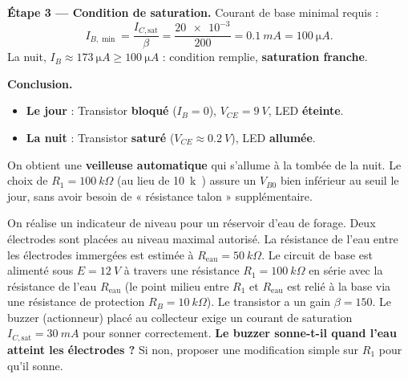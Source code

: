 \documentclass[11pt]{article}
\begin{document}
\begin{exoresolu}
\textbf{Étape 3 — Condition de saturation.}
Courant de base minimal requis :
\[ I_{B,\min} = \frac{I_{C,\text{sat}}}{\beta} = \frac{\num{20e-3}}{200} = \SI{0,1}{mA} = \SI{100}{\micro A}. \]
La nuit, $I_B \approx \SI{173}{\micro A} \geq \SI{100}{\micro A}$ : condition remplie, \textbf{saturation franche}.

\textbf{Conclusion.}
\begin{itemize}
\item \textbf{Le jour} : Transistor \textbf{bloqué} ($I_B=0$), $V_{CE} = \SI{9}{V}$, LED \textbf{éteinte}.
\item \textbf{La nuit} : Transistor \textbf{saturé} ($V_{CE} \approx \SI{0,2}{V}$), LED \textbf{allumée}.
\end{itemize}
On obtient une \textbf{veilleuse automatique} qui s'allume à la tombée de la nuit. Le choix de $R_1 = \SI{100}{k\Omega}$ (au lieu de \SI{10}{k\Omega}) assure un $V_{B0}$ bien inférieur au seuil le jour, sans avoir besoin de « résistance talon » supplémentaire.
\end{exoresolu}

\begin{exercice}
On réalise un indicateur de niveau pour un réservoir d'eau de forage. Deux électrodes sont placées au niveau maximal autorisé. La résistance de l'eau entre les électrodes immergées est estimée à $R_{\text{eau}} = \SI{50}{k\Omega}$. Le circuit de base est alimenté sous $E = \SI{12}{V}$ à travers une résistance $R_1 = \SI{100}{k\Omega}$ en série avec la résistance de l'eau $R_{\text{eau}}$ (le point milieu entre $R_1$ et $R_{\text{eau}}$ est relié à la base via une résistance de protection $R_B = \SI{10}{k\Omega}$). Le transistor a un gain $\beta = 150$. Le buzzer (actionneur) placé au collecteur exige un courant de saturation $I_{C,\text{sat}} = \SI{30}{mA}$ pour sonner correctement.
\textbf{Le buzzer sonne-t-il quand l'eau atteint les électrodes ?} Si non, proposer une modification simple sur $R_1$ pour qu'il sonne.
\end{exercice}
\end{document}
